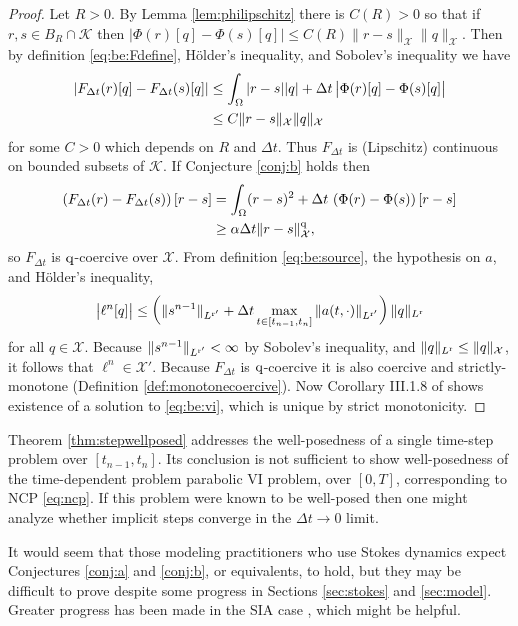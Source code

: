 \documentclass[hidelinks,onefignum,onetabnum,final]{siamart220329}  %
\newcommand{\cK}{\mathcal{K}}
\newcommand{\cX}{\mathcal{X}}
\newcommand{\qq}{{\text{\textnormal{q}}}}
\newcommand{\rr}{{\text{\textnormal{r}}}}
\begin{document}
\begin{proof}  Let $R>0$.  By Lemma \ref{lem:philipschitz} there is $C(R)>0$ so that if $r,s\in B_R\cap\cK$ then $\big|\Phi(r)[q] - \Phi(s)[q]\big| \le C(R) \|r-s\|_{\cX} \|q\|_{\cX}$.  Then by definition \eqref{eq:be:Fdefine}, H\"older's inequality, and Sobolev's inequality we have
\begin{align}
\left|F_{\Delta t}(r)[q] - F_{\Delta t}(s)[q]\right| &\le \int_\Omega |r-s||q| + \Delta t\, \big|\Phi(r)[q] - \Phi(s)[q]\big| \\
    &\le C \|r-s\|_{\cX} \|q\|_\cX \notag
\end{align}
for some $C>0$ which depends on $R$ and $\Delta t$.  Thus $F_{\Delta t}$ is (Lipschitz) continuous on bounded subsets of $\cK$.  If Conjecture \ref{conj:b} holds then
\begin{align}
\left(F_{\Delta t}(r) - F_{\Delta t}(s)\right)[r-s] &= \int_\Omega (r-s)^2 + \Delta t\, \left(\Phi(r) - \Phi(s)\right)[r-s] \\
    &\ge \alpha\Delta t \|r-s\|_{\cX}^\qq, \notag
\end{align}
so $F_{\Delta t}$ is $\qq$-coercive over $\cX$.  From definition \eqref{eq:be:source}, the hypothesis on $a$, and H\"older's inequality,
\begin{equation}
\big|\ell^n[q]\big| \le \left(\|s^{n-1}\|_{L^{\rr'}} + \Delta t \max_{t\in[t_{n-1},t_n]} \|a(t,\cdot)\|_{L^{\rr'}}\right) \|q\|_{L^\rr}
\label{eq:sourcetermbound}
\end{equation}
for all $q \in \cX$.  Because $\|s^{n-1}\|_{L^{\rr'}}<\infty$ by Sobolev's inequality, and $\|q\|_{L^\rr} \le \|q\|_{\cX}$, it follows that $\ell^n \in \cX'$.  Because $F_{\Delta t}$ is $\qq$-coercive it is also coercive and strictly-monotone (Definition \ref{def:monotonecoercive}).  Now Corollary III.1.8 of \cite{KinderlehrerStampacchia1980} shows existence of a solution to \eqref{eq:be:vi}, which is unique by strict monotonicity.
\end{proof}

Theorem \ref{thm:stepwellposed} addresses the well-posedness of a single time-step problem over $[t_{n-1},t_n]$.  Its conclusion is not sufficient to show well-posedness of the time-dependent problem parabolic VI problem, over $[0,T]$, corresponding to NCP \eqref{eq:ncp}.  If this problem were known to be well-posed then one might analyze whether implicit steps converge in the $\Delta t\to 0$ limit.

It would seem that those modeling practitioners who use Stokes dynamics expect Conjectures \ref{conj:a} and \ref{conj:b}, or equivalents, to hold, but they may be difficult to prove despite some progress in Sections \ref{sec:stokes} and \ref{sec:model}.  Greater progress has been made in the SIA case \cite{Calvoetal2003,JouvetBueler2012,PiersantiTemam2023}, which might be helpful.
\end{document}
